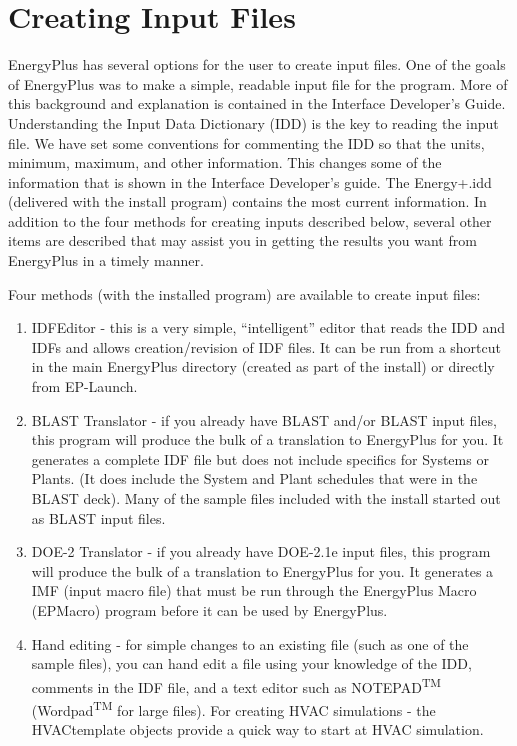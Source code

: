 \chapter{Creating Input Files}\label{creating-input-files}

EnergyPlus has several options for the user to create input files. One of the goals of EnergyPlus was to make a simple, readable input file for the program. More of this background and explanation is contained in the Interface Developer's Guide. Understanding the Input Data Dictionary (IDD) is the key to reading the input file. We have set some conventions for commenting the IDD so that the units, minimum, maximum, and other information. This changes some of the information that is shown in the Interface Developer's guide. The Energy+.idd (delivered with the install program) contains the most current information. In addition to the four methods for creating inputs described below, several other items are described that may assist you in getting the results you want from EnergyPlus in a timely manner.

Four methods (with the installed program) are available to create input files:

\begin{enumerate}
\def\labelenumi{\arabic{enumi})}
\item
  IDFEditor - this is a very simple, ``intelligent'' editor that reads the IDD and IDFs and allows creation/revision of IDF files. It can be run from a shortcut in the main EnergyPlus directory (created as part of the install) or directly from EP-Launch.
\item
  BLAST Translator - if you already have BLAST and/or BLAST input files, this program will produce the bulk of a translation to EnergyPlus for you. It generates a complete IDF file but does not include specifics for Systems or Plants. (It does include the System and Plant schedules that were in the BLAST deck). Many of the sample files included with the install started out as BLAST input files.
\item
  DOE-2 Translator - if you already have DOE-2.1e input files, this program will produce the bulk of a translation to EnergyPlus for you. It generates a IMF (input macro file) that must be run through the EnergyPlus Macro (EPMacro) program before it can be used by EnergyPlus.
\item
  Hand editing - for simple changes to an existing file (such as one of the sample files), you can hand edit a file using your knowledge of the IDD, comments in the IDF file, and a text editor such as NOTEPAD\textsuperscript{TM} (Wordpad\textsuperscript{TM} for large files). For creating HVAC simulations - the HVACtemplate objects provide a quick way to start at HVAC simulation.
\end{enumerate}
